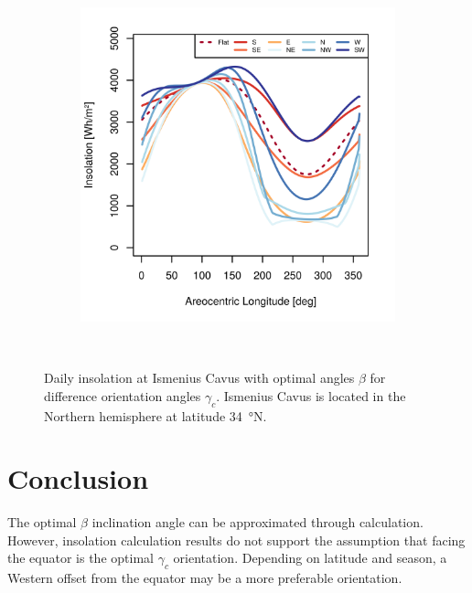 \begin{figure}[h]
\begin{subfigure}[t]{\subfigureWidth}
            \includegraphics[height=\graphicsHeight]{sections/appendix/optimal-angles/plots/ismenius-cavus-tau-04-and-beta-optimal-based-on-solar-insolation.png}
            \label{fig:sub:optimal-angles-ismenius-cavus-based-on-insolation}
    \end{subfigure}\\[0.8ex]
    \caption[Daily insolation at Ismenius Cavus with optimal angles $\beta$ for difference orientation angles $\gamma_c$]
    {Daily insolation at Ismenius Cavus with optimal angles $\beta$ for difference orientation angles $\gamma_c$. Ismenius Cavus is located in the Northern hemisphere at latitude \SI{34}{\degree}N.}
    \label{fig:plot:optimal-angles-ismenius-cavus}
\vspace{-2ex}
\end{figure}

\section{Conclusion}
The optimal $\beta$ inclination angle can be approximated through calculation. However, insolation calculation results do not support the assumption that facing the equator is the optimal $\gamma_c$ orientation. Depending on latitude and season, a Western offset from the equator may be a more preferable orientation.
